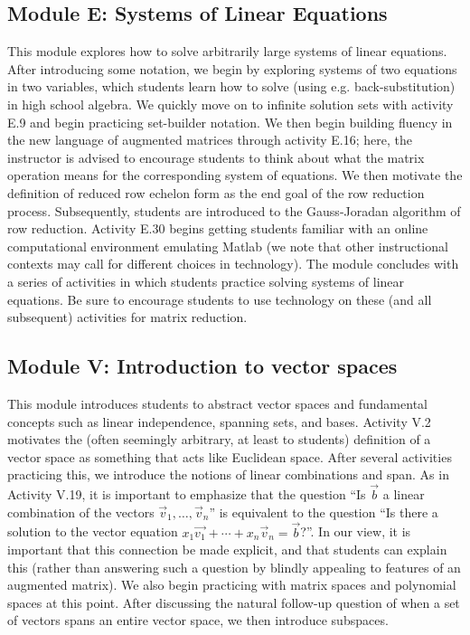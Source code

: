 \documentclass{article}
\begin{document}
\subsection*{Module E: Systems of Linear Equations}
This module explores how to solve arbitrarily large systems of linear equations.  
After introducing some notation, we begin by exploring systems of two equations in two variables, which students learn how to solve (using e.g. back-substitution) in high school algebra.  We quickly move on to infinite solution sets with activity E.9 and begin practicing set-builder notation.  We then begin building fluency in the new language of augmented matrices through activity E.16; here, the instructor is advised to encourage students to think about what the matrix operation means for the corresponding system of equations.  We then motivate the definition of reduced row echelon form as the end goal of the row reduction process. Subsequently, students are introduced to the Gauss-Joradan algorithm of row reduction. Activity E.30 begins getting students familiar with an online computational environment emulating Matlab (we note that other instructional contexts may call for different choices in technology). The module concludes with a series of activities in which students practice solving systems of linear equations. Be sure to encourage students to use technology on these (and all subsequent) activities for matrix reduction. 
 
\subsection*{Module V: Introduction to vector spaces}

This module introduces students to abstract vector spaces and fundamental concepts such as linear independence, spanning sets, and bases.  Activity V.2 motivates the (often seemingly arbitrary, at least to students) definition of a vector space as something that acts like Euclidean space.  After several activities practicing this, we introduce the notions of linear combinations and span. As in Activity V.19, it is important to emphasize that the question ``Is \(\vec{b}\) a linear combination of the vectors \(\vec{v}_1,\ldots,\vec{v}_n\)'' is equivalent to the question ``Is there a solution to the vector equation \(x_1\vec{v_1}+\cdots+x_n\vec{v}_n=\vec{b}\)?''. In our view, it is important that this connection be made explicit, and that students can explain this (rather than answering such a question by blindly appealing to features of an augmented matrix). We also begin practicing with matrix spaces and polynomial spaces at this point. After discussing the natural follow-up question of when a set of vectors spans an entire vector space, we then introduce subspaces.
\end{document}
